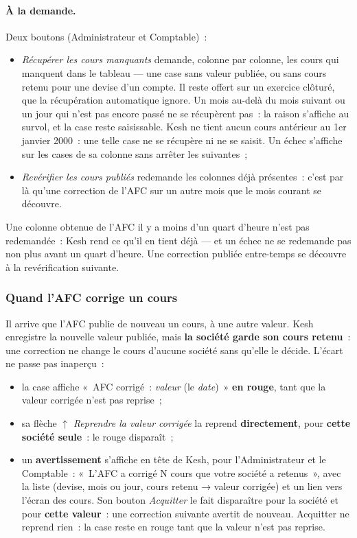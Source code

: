 \documentclass[a4paper,11pt,oneside]{article}
\begin{document}
\paragraph{À la demande.} Deux boutons (Administrateur et Comptable)~:
\begin{itemize}
    \item \emph{Récupérer les cours manquants} demande, colonne par colonne, les cours qui manquent dans le tableau --- une case sans valeur publiée, ou sans cours retenu pour une devise d'un compte. Il reste offert sur un exercice clôturé, que la récupération automatique ignore. Un mois au-delà du mois suivant ou un jour qui n'est pas encore passé ne se récupèrent pas~: la raison s'affiche au survol, et la case reste saisissable. Kesh ne tient aucun cours antérieur au 1er janvier 2000~: une telle case ne se récupère ni ne se saisit. Un échec s'affiche sur les cases de sa colonne sans arrêter les suivantes~;
    \item \emph{Revérifier les cours publiés} redemande les colonnes déjà présentes~: c'est par là qu'une correction de l'AFC sur un autre mois que le mois courant se découvre.
\end{itemize}
Une colonne obtenue de l'AFC il y a moins d'un quart d'heure n'est pas redemandée~: Kesh rend ce qu'il en tient déjà --- et un échec ne se redemande pas non plus avant un quart d'heure. Une correction publiée entre-temps se découvre à la revérification suivante.

\subsubsection{Quand l'AFC corrige un cours}\label{sec:cours-correction}

Il arrive que l'AFC publie de nouveau un cours, à une autre valeur. Kesh enregistre la nouvelle valeur publiée, mais \textbf{la société garde son cours retenu}~: une correction ne change le cours d'aucune société sans qu'elle le décide. L'écart ne passe pas inaperçu~:
\begin{itemize}
    \item la case affiche «~AFC corrigé~: \emph{valeur} (le \emph{date})~» \textbf{en rouge}, tant que la valeur corrigée n'est pas reprise~;
    \item sa flèche $\uparrow$ \emph{Reprendre la valeur corrigée} la reprend \textbf{directement}, pour \textbf{cette société seule}~: le rouge disparaît~;
    \item un \textbf{avertissement} s'affiche en tête de Kesh, pour l'Administrateur et le Comptable~: «~L'AFC a corrigé N cours que votre société a retenus~», avec la liste (devise, mois ou jour, cours retenu → valeur corrigée) et un lien vers l'écran des cours. Son bouton \emph{Acquitter} le fait disparaître pour la société et pour \textbf{cette valeur}~: une correction suivante avertit de nouveau. Acquitter ne reprend rien~: la case reste en rouge tant que la valeur n'est pas reprise.
\end{itemize}
\end{document}

